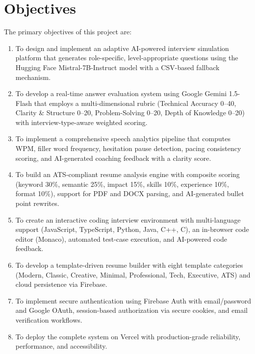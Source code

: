 \documentclass[12pt,a4paper,oneside]{report}
\begin{document}
\section{Objectives}
\label{sec:objectives}

The primary objectives of this project are:

\begin{enumerate}
  \item To design and implement an adaptive AI-powered interview simulation platform that generates role-specific, level-appropriate questions using the Hugging Face Mistral-7B-Instruct model with a CSV-based fallback mechanism.

  \item To develop a real-time answer evaluation system using Google Gemini 1.5-Flash that employs a multi-dimensional rubric (Technical Accuracy 0--40, Clarity \& Structure 0--20, Problem-Solving 0--20, Depth of Knowledge 0--20) with interview-type-aware weighted scoring.

  \item To implement a comprehensive speech analytics pipeline that computes WPM, filler word frequency, hesitation pause detection, pacing consistency scoring, and AI-generated coaching feedback with a clarity score.

  \item To build an ATS-compliant resume analysis engine with composite scoring (keyword 30\%, semantic 25\%, impact 15\%, skills 10\%, experience 10\%, format 10\%), support for PDF and DOCX parsing, and AI-generated bullet point rewrites.

  \item To create an interactive coding interview environment with multi-language support (JavaScript, TypeScript, Python, Java, C++, C), an in-browser code editor (Monaco), automated test-case execution, and AI-powered code feedback.

  \item To develop a template-driven resume builder with eight template categories (Modern, Classic, Creative, Minimal, Professional, Tech, Executive, ATS) and cloud persistence via Firebase.

  \item To implement secure authentication using Firebase Auth with email/password and Google OAuth, session-based authorization via secure cookies, and email verification workflows.

  \item To deploy the complete system on Vercel with production-grade reliability, performance, and accessibility.
\end{enumerate}
\end{document}

